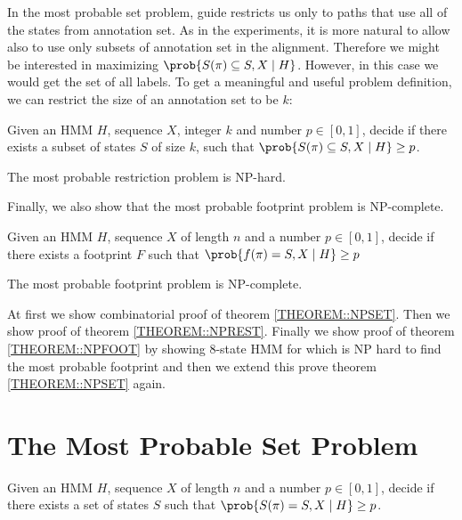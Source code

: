 In the most probable set problem, guide restricts us only to paths that use all
of the states from annotation set. As in the experiments, it is more natural to 
allow also to use only subsets of annotation set in the alignment. Therefore we
might be interested in maximizing $\prob{S(\pi) \subseteq S, X\mid H}$. However, 
in this case we would get the set of all labels. To get a meaningful and useful
problem definition, we can restrict the size of an annotation set to be $k$:

\begin{definition}
Given an HMM $H$, sequence $X$, integer $k$ and number $p\in[0,1]$, decide if
there exists a subset of states $S$ of size $k$, such that
$\prob{S(\pi)\subseteq S, X\mid H} \geq p$.
\end{definition}

\begin{theorem}
The most probable restriction problem is NP-hard. \label{THEOREM::NPREST}
\end{theorem}

Finally, we also show that the most probable footprint problem is NP-complete.
\begin{definition}
Given an HMM $H$, sequence $X$
of length $n$ and a number $p\in [0,1]$, decide if there exists a footprint $F$
such that $\prob{f(\pi) = S, X\mid H}\geq p$
\end{definition}

\begin{theorem}
The most probable footprint problem is NP-complete.
\label{THEOREM::NPFOOT}
\end{theorem}


At first we show combinatorial proof of theorem \ref{THEOREM::NPSET}. Then we
show proof of theorem \ref{THEOREM::NPREST}. Finally we show proof of theorem
\ref{THEOREM::NPFOOT} by showing $8$-state HMM for which is NP hard to find the
most probable footprint and then we extend this prove theorem
\ref{THEOREM::NPSET} again. 

\section{The Most Probable Set Problem}
\label{sec:set}

\begin{definition*} Given an HMM $H$, sequence $X$ of
length $n$ and a number $p\in [0,1]$, decide if there exists a set of states $S$
such that $\prob{S(\pi) = S, X\mid H} \geq p$.
\end{definition*}


